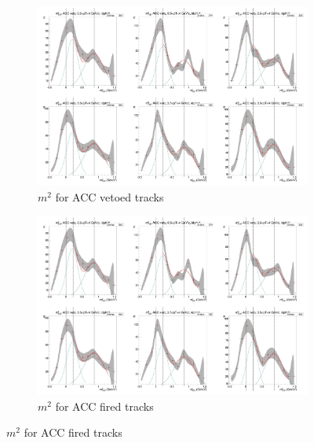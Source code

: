 \begin{figure}[H]
  \ContinuedFloat
    \begin{subfigure}{1\textwidth}
    \includegraphics[width=1\textwidth]{hiptfits/neg/PSm2_cent0_ich0_accfire0_ptbin13.jpg}
    \caption{$m^2$ for ACC vetoed tracks}
    \end{subfigure}
    \begin{subfigure}{1\textwidth}
    \includegraphics[width=1\textwidth]{hiptfits/neg/PSm2_cent0_ich0_accfire0_ptbin13.jpg}
    \caption{$m^2$ for ACC fired tracks}
    \end{subfigure}  
\end{figure}
